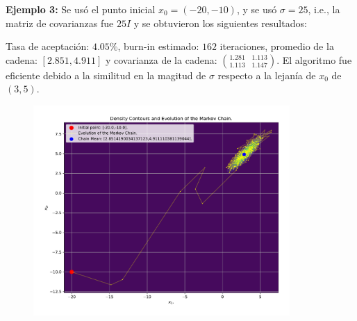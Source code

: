 \textbf{Ejemplo 3:} Se usó el punto inicial $x_0=(-20,-10)$, y se usó $\sigma = 25$, i.e., la matriz de covarianzas fue $25 I$ y se obtuvieron los siguientes resultados:

Tasa de aceptación: $4.05\%$, burn-in estimado: $162$ iteraciones, promedio de la cadena: $[2.851, 4.911]$ y covarianza de la cadena: $\binom{1.281\quad1.113}{1.113\quad1.147}$. El algoritmo fue eficiente debido a la similitud en la magitud de $\sigma$ respecto a la lejanía de $x_0$ de $(3,5)$.
\begin{figure}[h!]
	\centering
	\includegraphics[width=0.87\textwidth]{IMAGENES/ex3/contour_example3.pdf}
\end{figure}
